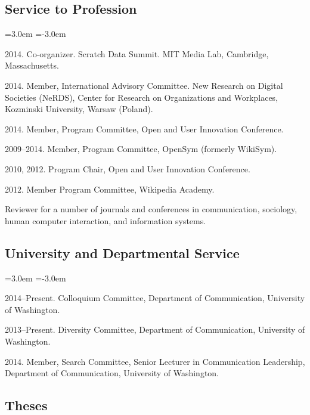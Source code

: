 \documentclass[10pt]{article}
\newenvironment{cvlist}{
\begin{list}{}{\leftmargin=3.0em \itemindent=-3.0em}
  \setlength{\itemsep}{0pt}
  \setlength{\parskip}{0em}
  \setlength{\parsep}{1em}
  \setlength{\parindent}{0em}}
{\vspace{1em}
\end{list}}
\begin{document}
\subsection{Service to Profession}

\begin{cvlist}
\item 2014. Co-organizer. Scratch Data Summit. MIT Media Lab, Cambridge, Massachusetts.
\item 2014. Member, International Advisory Committee. New Research on Digital Societies (NeRDS), Center for Research on Organizations and Workplaces, Kozminski University, Warsaw (Poland).
\item 2014. Member, Program Committee, Open and User Innovation Conference.
\item 2009--2014. Member, Program Committee, OpenSym (formerly WikiSym).
\item 2010, 2012. Program Chair, Open and User Innovation Conference.
\item 2012. Member Program Committee, Wikipedia Academy.
\item Reviewer for a number of journals and conferences in communication, sociology, human computer interaction, and information systems.
\end{cvlist}

\subsection{University and Departmental Service}
\begin{cvlist}
\item 2014--Present. Colloquium Committee, Department of Communication, University of Washington.
\item 2013--Present. Diversity Committee, Department of Communication, University of Washington.
\item 2014. Member, Search Committee, Senior Lecturer in Communication Leadership, Department of Communication, University of Washington.
\end{cvlist}

\subsection{Theses}
\end{document}
